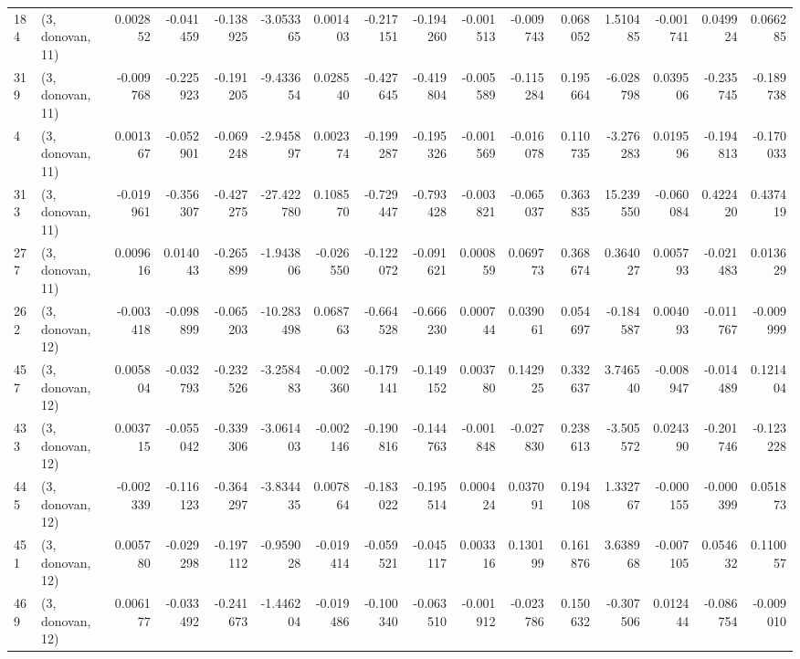 \begin{tabular}{llrrrrrrrrrrrrrr}
184 &  (3, donovan, 11) &   0.002852 & -0.041459 & -0.138925 &   -3.053365 &  0.001403 &  -0.217151 & -0.194260 & -0.001513 & -0.009743 &  0.068052 &     1.510485 & -0.001741 &  0.049924 &  0.066285 \\
319 &  (3, donovan, 11) &  -0.009768 & -0.225923 & -0.191205 &   -9.433654 &  0.028540 &  -0.427645 & -0.419804 & -0.005589 & -0.115284 &  0.195664 &    -6.028798 &  0.039506 & -0.235745 & -0.189738 \\
4   &  (3, donovan, 11) &   0.001367 & -0.052901 & -0.069248 &   -2.945897 &  0.002374 &  -0.199287 & -0.195326 & -0.001569 & -0.016078 &  0.110735 &    -3.276283 &  0.019596 & -0.194813 & -0.170033 \\
313 &  (3, donovan, 11) &  -0.019961 & -0.356307 & -0.427275 &  -27.422780 &  0.108570 &  -0.729447 & -0.793428 & -0.003821 & -0.065037 &  0.363835 &    15.239550 & -0.060084 &  0.422420 &  0.437419 \\
277 &  (3, donovan, 11) &   0.009616 &  0.014043 & -0.265899 &   -1.943806 & -0.026550 &  -0.122072 & -0.091621 &  0.000859 &  0.069773 &  0.368674 &     0.364027 &  0.005793 & -0.021483 &  0.013629 \\
262 &  (3, donovan, 12) &  -0.003418 & -0.098899 & -0.065203 &  -10.283498 &  0.068763 &  -0.664528 & -0.666230 &  0.000744 &  0.039061 &  0.054697 &    -0.184587 &  0.004093 & -0.011767 & -0.009999 \\
457 &  (3, donovan, 12) &   0.005804 & -0.032793 & -0.232526 &   -3.258483 & -0.002360 &  -0.179141 & -0.149152 &  0.003780 &  0.142925 &  0.332637 &     3.746540 & -0.008947 & -0.014489 &  0.121404 \\
433 &  (3, donovan, 12) &   0.003715 & -0.055042 & -0.339306 &   -3.061403 & -0.002146 &  -0.190816 & -0.144763 & -0.001848 & -0.027830 &  0.238613 &    -3.505572 &  0.024390 & -0.201746 & -0.123228 \\
445 &  (3, donovan, 12) &  -0.002339 & -0.116123 & -0.364297 &   -3.834435 &  0.007864 &  -0.183022 & -0.195514 &  0.000424 &  0.037091 &  0.194108 &     1.332767 & -0.000155 & -0.000399 &  0.051873 \\
451 &  (3, donovan, 12) &   0.005780 & -0.029298 & -0.197112 &   -0.959028 & -0.019414 &  -0.059521 & -0.045117 &  0.003316 &  0.130199 &  0.161876 &     3.638968 & -0.007105 &  0.054632 &  0.110057 \\
469 &  (3, donovan, 12) &   0.006177 & -0.033492 & -0.241673 &   -1.446204 & -0.019486 &  -0.100340 & -0.063510 & -0.001912 & -0.023786 &  0.150632 &    -0.307506 &  0.012444 & -0.086754 & -0.009010 \\

\end{tabular}
